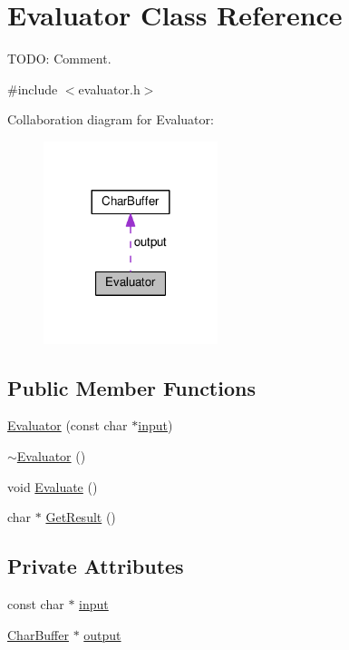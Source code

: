\hypertarget{classEvaluator}{}\section{Evaluator Class Reference}
\label{classEvaluator}


T\+O\+DO\+: Comment.  




{\ttfamily \#include $<$evaluator.\+h$>$}



Collaboration diagram for Evaluator\+:\nopagebreak
\begin{figure}[H]
\begin{center}
\leavevmode
\includegraphics[width=144pt]{classEvaluator__coll__graph}
\end{center}
\end{figure}
\subsection*{Public Member Functions}
\begin{DoxyCompactItemize}
\item 
\hyperlink{classEvaluator_a5eb7fa4c5ccc81b3f9e88980b9d62dd5}{Evaluator} (const char $\ast$\hyperlink{classEvaluator_a13bf216912227688690b87072bffcd59}{input})
\item 
\hyperlink{classEvaluator_ac10971f54d227b1ef9aa5b28872b0272}{$\sim$\+Evaluator} ()
\item 
void \hyperlink{classEvaluator_a40b30ece9d43c658877ee7f52aaec0a8}{Evaluate} ()
\item 
char $\ast$ \hyperlink{classEvaluator_abcc678772175bf00127a3b307463ae4b}{Get\+Result} ()
\end{DoxyCompactItemize}
\subsection*{Private Attributes}
\begin{DoxyCompactItemize}
\item 
const char $\ast$ \hyperlink{classEvaluator_a13bf216912227688690b87072bffcd59}{input}
\item 
\hyperlink{classCharBuffer}{Char\+Buffer} $\ast$ \hyperlink{classEvaluator_a35018fd9dd13289a6dbf967cd1acd13c}{output}
\end{DoxyCompactItemize}


